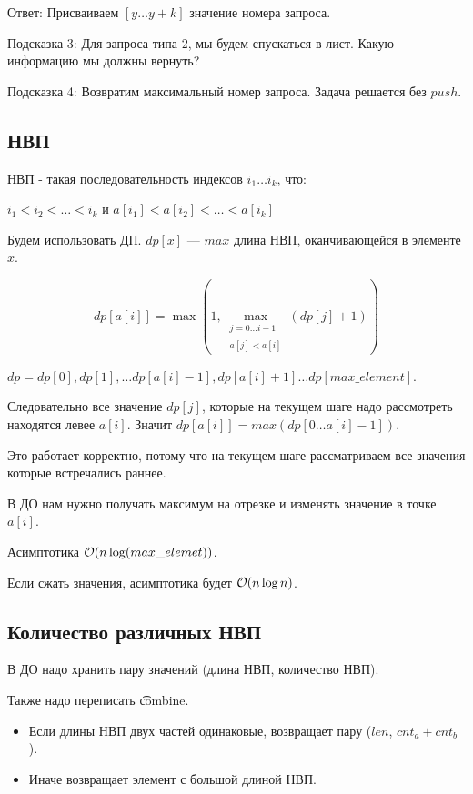 Ответ: Присваиваем $[y \dots y + k]$ значение номера запроса.

Подсказка 3: Для запроса типа $2$, мы будем спускаться в лист. Какую информацию мы должны вернуть?

Подсказка 4: Возвратим максимальный номер запроса. Задача решается без $push$.

\subsection{НВП}

НВП - такая последовательность индексов $i_1 \ldots i_k$, что: 

$i_1 < i_2 < \dots < i_k$ и $a[i_1] < a[i_2] < \dots < a[i_k]$

\down

Будем использовать ДП. $dp[x]$ --- $max$ длина НВП, оканчивающейся в элементе $x$.

$$dp[a[i]] = \max\left(1, \max_{\substack{j = 0 \dots i-1 \\\\ a[j] < a[i]}} \left(dp[j] + 1\right)\right)$$

$dp = {dp[0], dp[1], \ldots dp[a[i] - 1], dp[a[i] + 1] \ldots dp[max\_element]}$.

Следовательно все значение $dp[j]$, которые на текущем шаге надо рассмотреть находятся левее $a[i]$. Значит $dp[a[i]] = max(dp[0 \ldots a[i] - 1])$.

\down

Это работает корректно, потому что на текущем шаге рассматриваем все значения которые встречались раннее. 

\down

В ДО нам нужно получать максимум на отрезке и изменять значение в точке $a[i]$.

Асимптотика $\mathcal{O}(n \log(max\_elemet))$.

Если сжать значения, асимптотика будет $\mathcal{O}(n \log n)$.

\subsection{Количество различных НВП}

В ДО надо хранить пару значений (длина НВП, количество НВП).

Также надо переписать \t{combine}.

\up \up

\begin{itemize}
	\item Если длины НВП двух частей одинаковые, возвращает пару ($len$, $cnt_a + cnt_b$).
	
	\item Иначе возвращает элемент с большой длиной НВП.
\end{itemize} \up \up


